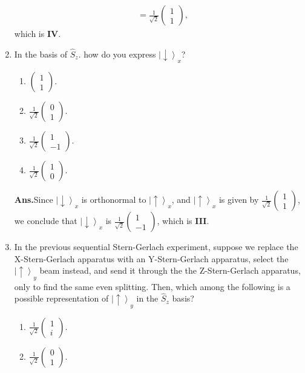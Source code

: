 \documentclass[12pt]{article}
\newcommand\rr{\right \rangle}
\newcommand\ls{\left |}
\newcommand\hs{\hat{S}}
\newcommand\tbf[1]{\textbf{#1}}
\newcommand\ua{\uparrow}
\newcommand\da{\downarrow}
\newcommand\rhalf{\frac{1}{\sqrt{2}}}
\newcommand\tans{\tbf{Ans.}}
\newcommand\usp{\ls \ua \rr}
\newcommand\dsp{\ls \da \rr}
\newcommand\sg{Stern-Gerlach }
\begin{document}
\begin{enumerate}[\bf 1.]
$$\begin{aligned}
	&= \rhalf \left(\begin{array}{c} 1 \\ 1 \end{array}\right),
\end{aligned}
$$
which is {\bf IV}.
\vskip 1.5cm
\item In the basis of $\hs _z$. how do you express $\dsp _x$?
\begin{enumerate}[\bf I.]
\item $\left(\begin{array}{c} 1 \\ 1 \end{array}\right)$.
\item $\rhalf \left(\begin{array}{c} 0 \\ 1 \end{array}\right)$.
\item $\rhalf \left(\begin{array}{c} 1 \\ -1 \end{array}\right)$.
\item $\rhalf \left(\begin{array}{c} 1 \\ 0 \end{array}\right)$.
\end{enumerate}
\vskip 1cm
\tans Since $\dsp_x$ is orthonormal to $\usp_x$, and $\usp_x$ is given by $\rhalf \left(\begin{array}{c} 1 \\ 1 \end{array}\right)$, we conclude that $\dsp_x$ is $\rhalf \left(\begin{array}{c} 1 \\ -1 \end{array}\right)$, which is {\bf III}.
\vskip 1.5cm
\item In the previous sequential \sg experiment, suppose we replace the X-\sg apparatus with an Y-\sg apparatus, select the $\usp_y$ beam instead, and send it through the the Z-\sg apparatus, only to find the same even splitting. Then, which among the following is a possible representation of $\usp _y$ in the $\hs_z$ basis?
\begin{enumerate}[\bf I.]
\item $\rhalf \left(\begin{array}{c} 1 \\ i \end{array}\right)$.
\item $\rhalf \left(\begin{array}{c} 0 \\ 1 \end{array}\right)$.

\end{enumerate}
\end{enumerate}
\end{document}
